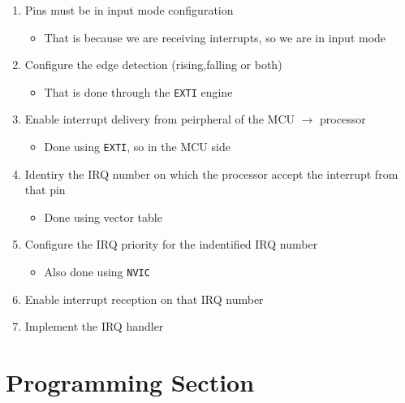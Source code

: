 \begin{enumerate}

\item Pins must be in input mode configuration

	\begin{itemize}
	\item That is because we are receiving interrupts, so we are in input mode
	\end{itemize}

\item Configure the edge detection (rising,falling or both)
	
		\begin{itemize}
		\item That is done through the \verb|EXTI| engine
		\end{itemize}

\item Enable interrupt delivery from peirpheral of the MCU $\rightarrow$ processor


	\begin{itemize}
	\item Done using \verb|EXTI|, so in the MCU side
	\end{itemize}

\item Identiry the IRQ number on which the processor accept the interrupt from that pin

	\begin{itemize}
	\item Done using vector table
	\end{itemize}

\item Configure the IRQ priority for the indentified IRQ number 

	\begin{itemize}
	\item Also done using \verb|NVIC|
	\end{itemize}

\item Enable interrupt reception on that IRQ number 

\item Implement the IRQ handler

\end{enumerate}




\newpage
\section{Programming Section}


